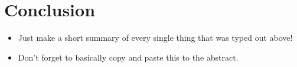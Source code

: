 \documentclass{article}
\begin{document}
\section{Conclusion}
\begin{itemize}
    \item Just make a short summary of every single thing that was typed out above!
    \item Don't forget to basically copy and paste this to the abstract.
\end{itemize}


\newpage


\end{document}
